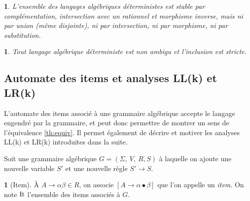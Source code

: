 \documentclass[11pt,a4paper]{article}
\theoremstyle{plain}
\theoremstyle{definition}
\newtheorem{defn}[thm]{\protect\definitionname}
\theoremstyle{definition}
\theoremstyle{remark}
\theoremstyle{remark}
\theoremstyle{plain}
\theoremstyle{plain}
\newtheorem{prop}[thm]{\protect\propositionname}
\theoremstyle{plain}
\theoremstyle{remark}
\providecommand{\definitionname}{Définition}
\providecommand{\propositionname}{Proposition}
\begin{document}
\begin{prop}
	L'ensemble des langages algébriques déterministes est stable par complémentation, intersection avec un rationnel et morphisme inverse, mais ni par union (même disjointe), ni par intersection, ni par morphisme, ni par substitution.
\end{prop}

\begin{prop} %
	Tout langage algébrique déterministe est non ambigu et l'inclusion est stricte.
\end{prop}

\subsection{Automate des items et analyses LL(k) et LR(k)}

L'automate des items associé à une grammaire algébrique accepte le langage engendré par la grammaire, et peut donc permettre de montrer un sens de l'équivalence \ref{th:equiv}. Il permet également de décrire et motiver les analyses LL(k) et LR(k) introduites dans la suite.

Soit une grammaire algébrique $G=\left(\Sigma,\ V,\ R, S\right)$ à
laquelle on ajoute une nouvelle variable $S'$ et une nouvelle règle
$S'\to S$.

\begin{defn}[Item]
À $A\to\alpha\beta\in R$, on associe $\left[A\to\alpha\bullet\beta\right]$
que l'on appelle un \emph{item}. On note $\operatorname{It}$ l'ensemble des items associés
à $G$.
\end{defn}
\end{document}
